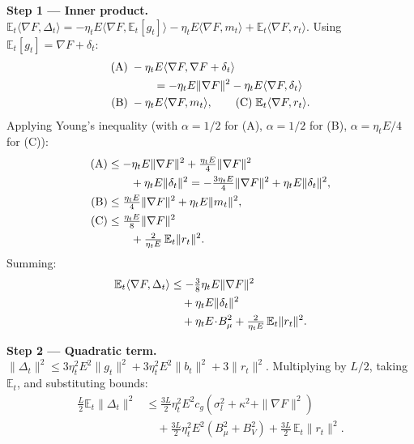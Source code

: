 \documentclass[journal]{IEEEtran}
\begin{document}
\noindent\textbf{Step 1 --- Inner product.}
\(\mathbb E_t\langle\nabla F, \Delta_t\rangle
 = -\eta_t E\langle\nabla F, \mathbb E_t[g_t]\rangle
   - \eta_t E\langle\nabla F, m_t\rangle
   + \mathbb E_t\langle\nabla F, r_t\rangle\).
Using \(\mathbb E_t[g_t] = \nabla F + \delta_t\):
\begin{align*}
  \text{(A)}\;& -\eta_t E\langle\nabla F, \nabla F + \delta_t\rangle \notag\\
              &\qquad = -\eta_t E\|\nabla F\|^2 - \eta_t E\langle\nabla F, \delta_t\rangle\\
  \text{(B)}\;& -\eta_t E\langle\nabla F, m_t\rangle,\qquad
  \text{(C)}\; \mathbb E_t\langle\nabla F, r_t\rangle.
\end{align*}
Applying Young's inequality (with \(\alpha = 1/2\) for (A), \(\alpha = 1/2\) for (B), \(\alpha = \eta_t E/4\) for (C)):
\begin{align*}
  \text{(A)} &\le -\eta_t E\|\nabla F\|^2 + \tfrac{\eta_t E}{4}\|\nabla F\|^2 \notag\\
             &\qquad + \eta_t E\|\delta_t\|^2
              = -\tfrac{3\eta_t E}{4}\|\nabla F\|^2 + \eta_t E\|\delta_t\|^2,\\
  \text{(B)} &\le \tfrac{\eta_t E}{4}\|\nabla F\|^2 + \eta_t E\|m_t\|^2,\\
  \text{(C)} &\le \tfrac{\eta_t E}{8}\|\nabla F\|^2 \notag\\
            &\qquad + \tfrac{2}{\eta_t E}\,\mathbb E_t\|r_t\|^2.
\end{align*}
Summing:
\begin{align*}
  \mathbb E_t\langle\nabla F, \Delta_t\rangle
  &\le -\tfrac{3}{8}\eta_t E\|\nabla F\|^2 \notag\\
  &\quad + \eta_t E\|\delta_t\|^2 \notag\\
  &\quad + \eta_t E\!\cdot\! B_\mu^2
     + \tfrac{2}{\eta_t E}\,\mathbb E_t\|r_t\|^2.
\end{align*}

\noindent\textbf{Step 2 --- Quadratic term.}
\(\|\Delta_t\|^2 \le 3\eta_t^2 E^2\|g_t\|^2 + 3\eta_t^2 E^2\|b_t\|^2 + 3\|r_t\|^2\).
Multiplying by \(L/2\), taking \(\mathbb E_t\), and substituting bounds:
\begin{align*}
  \frac{L}{2}\mathbb E_t\|\Delta_t\|^2
  &\le \frac{3L}{2}\eta_t^2 E^2 c_g(\sigma_l^2 + \kappa^2 + \|\nabla F\|^2) \\
  &\quad + \frac{3L}{2}\eta_t^2 E^2(B_\mu^2 + B_V^2)
     + \frac{3L}{2}\,\mathbb E_t\|r_t\|^2.
\end{align*}
\end{document}
